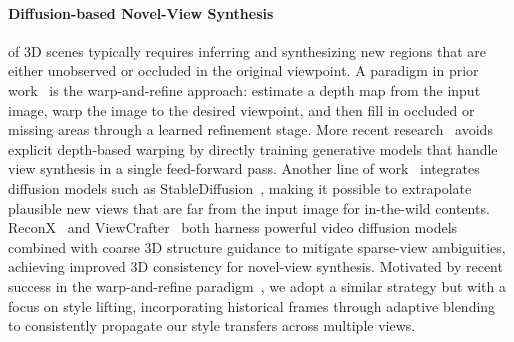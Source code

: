 \paragraph{\bf{Diffusion-based Novel-View Synthesis}}
of 3D scenes typically requires inferring and synthesizing new regions that are either unobserved or occluded in the original viewpoint.
A paradigm in prior work~\cite{wiles2020synsin, rockwell2021pixelsynth, liu2021infinitenature, koh2022simple} is the warp-and-refine approach: estimate a depth map from the input image, warp the image to the desired viewpoint, and then fill in occluded or missing areas through a learned refinement stage.
More recent research~\cite{rombach2021geometryfree, yu2023photoconsistentnvs, jin2024lvsm} avoids explicit depth-based warping by directly training generative models that handle view synthesis in a single feed-forward pass.
Another line of work~\cite{hao2023text2immersion, tang2023mvdiffusion, chung2023luciddreamer, shriram2024realmdreamer, Muller_2024_CVPR, cai2022diffdreamer, tseng2023poseguideddiffusion, yu2024viewcrafter, sun2024dimensionx, deng2024streetscapes, seo2024genwarp} integrates diffusion models such as StableDiffusion~\cite{rombach2022latentdiffusion}, making it possible to extrapolate plausible new views that are far from the input image for in-the-wild contents.
ReconX~\cite{liu2024reconx} and ViewCrafter~\cite{yu2024viewcrafter} both harness powerful video diffusion models combined with coarse 3D structure guidance to mitigate sparse-view ambiguities, achieving improved 3D consistency for novel-view synthesis.
Motivated by recent success in the warp-and-refine paradigm~\cite{seo2024genwarp}, we adopt a similar strategy but with a focus on style lifting, incorporating historical frames through adaptive blending to consistently propagate our style transfers across multiple views.


